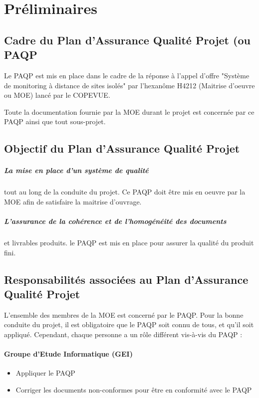 \section{Préliminaires}
\subsection{Cadre du Plan d’Assurance Qualité Projet (ou PAQP}
  Le PAQP est mis en place dans le cadre de la réponse à l'appel d'offre "Système de monitoring à distance de sites isolés" par l'hexanôme H4212 (Maitrise d'oeuvre ou MOE) lancé par le COPEVUE.

\par Toute la documentation fournie par la MOE durant le projet est concernée par ce PAQP ainsi que tout sous-projet.

\subsection{Objectif du Plan d’Assurance Qualité Projet}
\subparagraph{La mise en place d'un système de qualité} tout au long de la conduite du projet. Ce PAQP doit être mis en oeuvre par la MOE afin de satisfaire la maitrise d'ouvrage.
\subparagraph{L'assurance de la cohérence et de l'homogénéité des documents} et livrables produits. le PAQP est mis en place pour assurer la qualité du produit fini.

\subsection{Responsabilités associées au Plan d’Assurance Qualité Projet}                        
L'ensemble des membres de la MOE est concerné par le PAQP. Pour la bonne conduite du projet, il est obligatoire que le PAQP soit connu de tous, et qu'il soit appliqué. Cependant, chaque personne a un rôle différent vis-à-vis du PAQP :

\paragraph{Groupe d'Etude Informatique (GEI)\\}	 
                \begin{itemize}
                \item Appliquer le PAQP
                \item Corriger les documents non-conformes pour être en conformité avec le PAQP
                \end{itemize}

